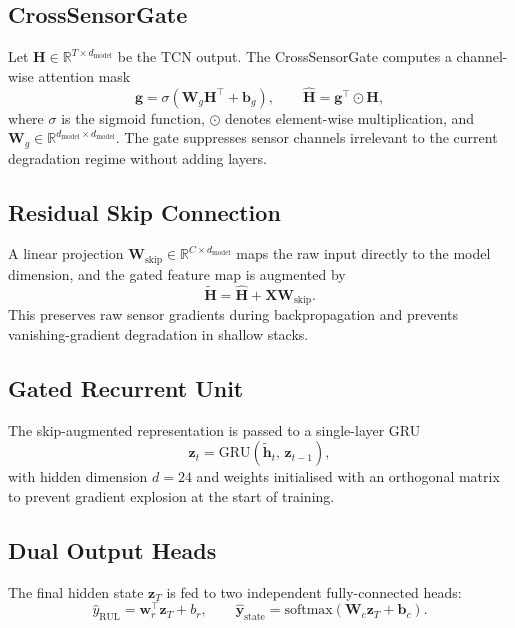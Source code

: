 \documentclass[AMA,Times1COL]{WileyNJDv5}
\begin{document}
\subsection{CrossSensorGate}\label{sec:arch:gate}
Let $\mathbf{H} \in \mathbb{R}^{T \times d_{\text{model}}}$ be the TCN
output. The CrossSensorGate computes a channel-wise attention mask
\begin{equation}\label{eq:gate}
 \mathbf{g} = \sigma\!\left( \mathbf{W}_g \mathbf{H}^\top + \mathbf{b}_g \right),
 \qquad
 \hat{\mathbf{H}} = \mathbf{g}^\top \odot \mathbf{H},
\end{equation}
where $\sigma$ is the sigmoid function, $\odot$ denotes element-wise
multiplication, and $\mathbf{W}_g \in \mathbb{R}^{d_{\text{model}}
\times d_{\text{model}}}$. The gate suppresses sensor channels
irrelevant to the current degradation regime without adding layers.

\subsection{Residual Skip Connection}\label{sec:arch:skip}
A linear projection $\mathbf{W}_{\text{skip}} \in
\mathbb{R}^{C \times d_{\text{model}}}$ maps the raw input directly to
the model dimension, and the gated feature map is augmented by
\begin{equation}\label{eq:skip}
 \tilde{\mathbf{H}} = \hat{\mathbf{H}} + \mathbf{X}\mathbf{W}_{\text{skip}}.
\end{equation}
This preserves raw sensor gradients during backpropagation and
prevents vanishing-gradient degradation in shallow stacks.

\subsection{Gated Recurrent Unit}\label{sec:arch:gru}
The skip-augmented representation is passed to a single-layer GRU
\begin{equation}\label{eq:gru}
 \mathbf{z}_t = \text{GRU}\!\left(\tilde{\mathbf{h}}_t,\, \mathbf{z}_{t-1}\right),
\end{equation}
with hidden dimension $d = 24$ and weights initialised with an
orthogonal matrix~\cite{TODO} to prevent gradient explosion at the
start of training.

\subsection{Dual Output Heads}\label{sec:arch:heads}
The final hidden state $\mathbf{z}_T$ is fed to two independent
fully-connected heads:
\begin{equation}\label{eq:heads}
 \hat{y}_{\text{RUL}} = \mathbf{w}_r^\top \mathbf{z}_T + b_r,
 \qquad
 \hat{\mathbf{y}}_{\text{state}} = \text{softmax}\!\left(
 \mathbf{W}_c \mathbf{z}_T + \mathbf{b}_c \right).
\end{equation}
\end{document}
